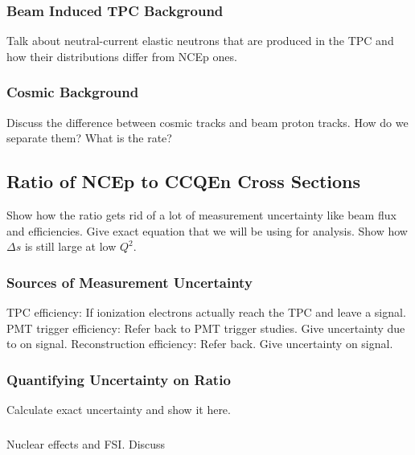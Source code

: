   \subsubsection{Beam Induced TPC Background}
    Talk about neutral-current elastic neutrons that are produced in the TPC
    and how their distributions differ from NCEp ones.
  \subsubsection{Cosmic Background}
    Discuss the difference between cosmic tracks and beam proton tracks. How do
    we separate them? What is the rate?

\subsection{Ratio of NCEp to CCQEn Cross Sections}\label{ratios}
  Show how the ratio gets rid of a lot of measurement uncertainty like beam
  flux and efficiencies. Give exact equation that we will be using for
  analysis. Show how $\Delta s$ is still large at low $Q^2$.
  \subsubsection{Sources of Measurement Uncertainty}
    TPC efficiency: If ionization electrons actually reach the
    TPC and leave a signal.
    PMT trigger efficiency: Refer back to PMT trigger studies. Give uncertainty due to on signal.
    Reconstruction efficiency: Refer back. Give uncertainty on signal.
  \subsubsection{Quantifying Uncertainty on Ratio}\label{errorcalc}
    Calculate exact uncertainty and show it here.
  \subsubsection{}
    Nuclear effects and FSI. Discuss 



